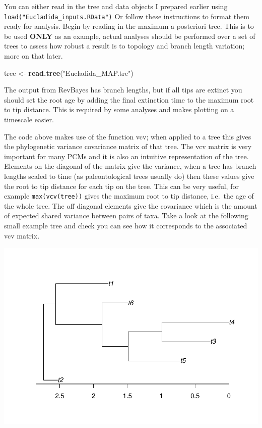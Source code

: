 \documentclass[]{article}
\newenvironment{Shaded}{\begin{snugshade}}{\end{snugshade}}
\newcommand{\KeywordTok}[1]{\textcolor[rgb]{0.13,0.29,0.53}{\textbf{#1}}}
\newcommand{\FloatTok}[1]{\textcolor[rgb]{0.00,0.00,0.81}{#1}}
\newcommand{\StringTok}[1]{\textcolor[rgb]{0.31,0.60,0.02}{#1}}
\newcommand{\OperatorTok}[1]{\textcolor[rgb]{0.81,0.36,0.00}{\textbf{#1}}}
\newcommand{\NormalTok}[1]{#1}
\begin{document}
You can either read in the tree and data objects I prepared earlier
using \texttt{load("Eucladida\_inputs.RData")} Or follow these
instructions to format them ready for analysis. Begin by reading in the
maximum a posteriori tree. This is to be used \textbf{ONLY} as an
example, actual analyses should be performed over a set of trees to
assess how robust a result is to topology and branch length variation;
more on that later.

\begin{Shaded}
\begin{Highlighting}[]
\NormalTok{tree <-}\StringTok{ }\KeywordTok{read.tree}\NormalTok{(}\StringTok{"Eucladida_MAP.tre"}\NormalTok{)}
\end{Highlighting}
\end{Shaded}

The output from RevBayes has branch lengths, but if all tips are extinct
you should set the root age by adding the final extinction time to the
maximum root to tip distance. This is required by some analyses and
makes plotting on a timescale easier.

\begin{Shaded}
\end{Shaded}

The code above makes use of the function vcv; when applied to a tree
this gives the phylogenetic variance covariance matrix of that tree. The
vcv matrix is very important for many PCMs and it is also an intuitive
representation of the tree. Elements on the diagonal of the matrix give
the variance, when a tree has branch lengths scaled to time (as
paleontological trees usually do) then these values give the root to tip
distance for each tip on the tree. This can be very useful, for example
\texttt{max(vcv(tree))} gives the maximum root to tip distance, i.e.~the
age of the whole tree. The off diagonal elements give the covariance
which is the amount of expected shared variance between pairs of taxa.
Take a look at the following small example tree and check you can see
how it corresponds to the associated vcv matrix.

\includegraphics[width=0.5\linewidth]{module_08_files/figure-latex/unnamed-chunk-5-1}
\end{document}
